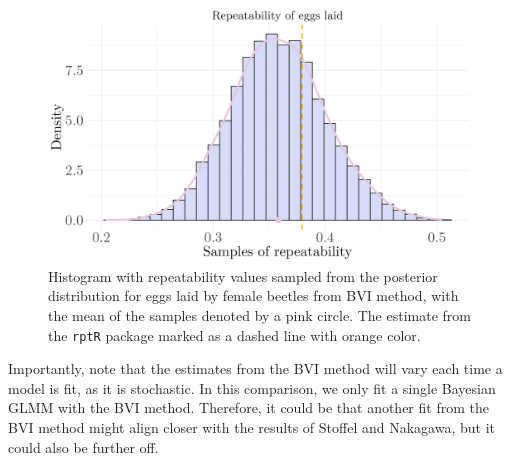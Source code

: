 \begin{figure}[H]
  \centering
  \includegraphics[width=1\linewidth]{Figures/Stoffel Comparison/Heritability_egg_poisson.png}
  \caption[Estimated repeatability of eggs laid by female beetles]{Histogram with repeatability values sampled from the posterior distribution for eggs laid by female beetles from BVI method, with the mean of the samples denoted by a pink circle. The estimate from the \texttt{rptR} package marked as a dashed line with orange color.}
  \label{fig:heritability_eggs_poisson}
\end{figure}
\noindent Importantly, note that the estimates from the BVI method will vary each time a model is fit, as it is stochastic. In this comparison, we only fit a single Bayesian GLMM with the BVI method. Therefore, it could be that another fit from the BVI method might align closer with the results of Stoffel and Nakagawa, but it could also be further off. 

